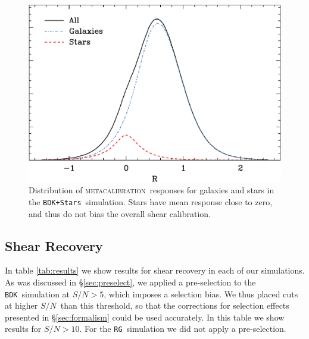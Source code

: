\documentclass[iop]{emulateapj}
\newcommand{\snr}{$S/N$}
\newcommand{\mcal}{\textsc{metacalibration}}
\newcommand{\bdksim}{\texttt{BDK}}
\newcommand{\bdstar}{\texttt{BDK+Stars}}
\newcommand{\rgsim}{\texttt{RG}}
\begin{document}
\begin{figure}[h]
    \centering
    \includegraphics[width=\columnwidth]{R-bdj03-bdj03stars.eps}

    \caption{Distribution of \mcal\ responses for galaxies and stars in
    the \bdstar\ simulation.  Stars have mean response close to zero,
    and thus do not bias the overall shear calibration.}

\label{fig:Rstars}
\end{figure}



\subsection{Shear Recovery} \label{sec:shear_recover}


In table \ref{tab:results} we show results for shear recovery in each of our
simulations.  As was discussed in \S \ref{sec:preselect}, we applied a
pre-selection to the \bdksim\ simulation at \snr$ > 5$, which imposes a
selection bias.  We thus placed cuts at higher \snr\ than this threshold, so
that the corrections for selection effects presented in \S \ref{sec:formalism}
could be used accurately.  In this table we show results for \snr$ > 10$.  For
the \rgsim\ simulation we did not apply a pre-selection.
\end{document}
